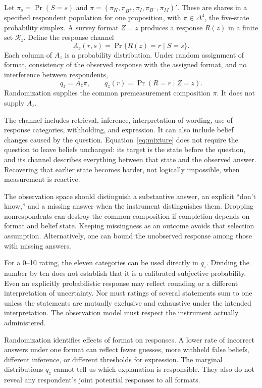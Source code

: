 \documentclass[11pt]{article}
\newcommand{\simplex}{\Delta^4}
\begin{document}
Let $\pi_s=\Pr(S=s)$ and $\pi=(\pi_K,\pi_{B^+},\pi_I,\pi_{B^-},\pi_M)'$. These are shares in a specified respondent population for one proposition, with $\pi\in\simplex$, the five-state probability simplex. A survey format $Z=z$ produces a response $R(z)$ in a finite set $\mathcal R_z$. Define the response channel
\begin{equation}
 A_z(r,s)=\Pr\{R(z)=r\mid S=s\}.
 \label{eq:channel}
\end{equation}
Each column of $A_z$ is a probability distribution. Under random assignment of format, consistency of the observed response with the assigned format, and no interference between respondents,
\begin{equation}
 q_z=A_z\pi,\qquad q_z(r)=\Pr(R=r\mid Z=z).
 \label{eq:mixture}
\end{equation}
Randomization supplies the common premeasurement composition $\pi$. It does not supply $A_z$.

The channel includes retrieval, inference, interpretation of wording, use of response categories, withholding, and expression. It can also include belief changes caused by the question. Equation~\eqref{eq:mixture} does not require the question to leave beliefs unchanged: its target is the state before the question, and its channel describes everything between that state and the observed answer. Recovering that earlier state becomes harder, not logically impossible, when measurement is reactive.

The observation space should distinguish a substantive answer, an explicit ``don't know,'' and a missing answer when the instrument distinguishes them. Dropping nonrespondents can destroy the common composition if completion depends on format and belief state. Keeping missingness as an outcome avoids that selection assumption. Alternatively, one can bound the unobserved response among those with missing answers.

For a 0--10 rating, the eleven categories can be used directly in $q_z$. Dividing the number by ten does not establish that it is a calibrated subjective probability. Even an explicitly probabilistic response may reflect rounding or a different interpretation of uncertainty. Nor must ratings of several statements sum to one unless the statements are mutually exclusive and exhaustive under the intended interpretation. The observation model must respect the instrument actually administered.

Randomization identifies effects of format on responses. A lower rate of incorrect answers under one format can reflect fewer guesses, more withheld false beliefs, different inference, or different thresholds for expression. The marginal distributions $q_z$ cannot tell us which explanation is responsible. They also do not reveal any respondent's joint potential responses to all formats.
\end{document}
